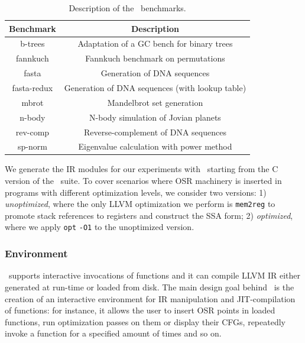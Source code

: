 \begin{table}[ht]
\begin{center}
\begin{small}
    \begin{tabular}{ |c|c| }
        \hline
        Benchmark & Description \\ 
        \hline
        \hline
        b-trees & Adaptation of a GC bench for binary trees \\ 
        \hline
        fannkuch & Fannkuch benchmark on permutations \\ 
        \hline
        fasta & Generation of DNA sequences \\ 
        \hline
        fasta-redux & Generation of DNA sequences (with lookup table) \\ 
        \hline
        mbrot & Mandelbrot set generation \\ 
        \hline
        n-body & N-body simulation of Jovian planets \\ 
        \hline
        rev-comp & Reverse-complement of DNA sequences \\ 
        \hline
        sp-norm & Eigenvalue calculation with power method \\ 
        \hline
    \end{tabular} 
\end{small}
\end{center}
\caption{\label{tab:osr-shootout} Description of the \shootout\ benchmarks.} 
\end{table}

We generate the IR modules for our experiments with \clang\ starting from the C version of the \shootout\ suite. To cover scenarios where OSR machinery is inserted in programs with different optimization levels, we consider two versions: 1) {\em unoptimized}, where the only LLVM optimization we perform is {\tt mem2reg} to promote stack references to registers and construct the SSA form; 2) {\em optimized}, where we apply {\tt opt} {\tt -O1} to the unoptimized version.

\subsubsection*{Environment}
\tinyvm\ supports interactive invocations of functions and it can compile LLVM IR either generated at run-time or loaded from disk. The main design goal behind \tinyvm\ is the creation of an interactive environment for IR manipulation and JIT-compilation of functions: for instance, it allows the user to insert OSR points in loaded functions, run optimization passes on them or display their CFGs, repeatedly invoke a function for a specified amount of times and so on.

